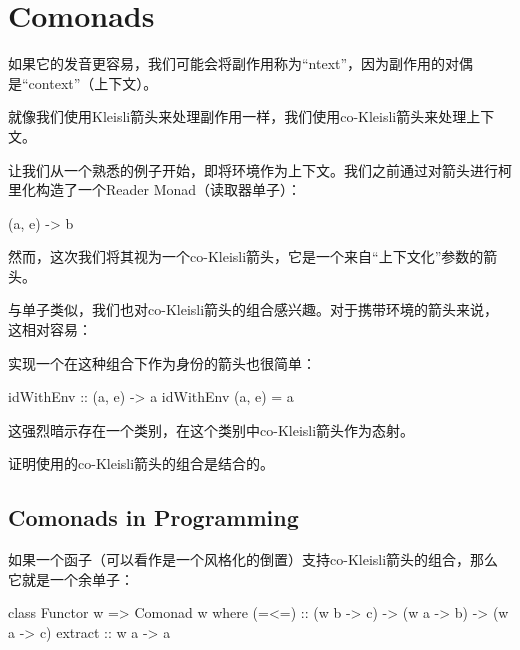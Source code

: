 \documentclass[DaoFP]{subfiles}
\begin{document}
    \setcounter{chapter}{15}

    \chapter{Comonads}

    如果它的发音更容易，我们可能会将副作用称为“ntext”，因为副作用的对偶是“context”（上下文）。

    就像我们使用Kleisli箭头来处理副作用一样，我们使用co-Kleisli箭头来处理上下文。

    让我们从一个熟悉的例子开始，即将环境作为上下文。我们之前通过对箭头进行柯里化构造了一个Reader Monad（读取器单子）：
    \begin{haskell}
    (a, e) -> b
    \end{haskell}
    然而，这次我们将其视为一个co-Kleisli箭头，它是一个来自“上下文化”参数的箭头。

    与单子类似，我们也对co-Kleisli箭头的组合感兴趣。对于携带环境的箭头来说，这相对容易：

    实现一个在这种组合下作为身份的箭头也很简单：
    \begin{haskell}
        idWithEnv :: (a, e) -> a
        idWithEnv (a, e) = a
    \end{haskell}

    这强烈暗示存在一个类别，在这个类别中co-Kleisli箭头作为态射。

    \begin{exercise}
        证明使用的co-Kleisli箭头的组合是结合的。
    \end{exercise}

    \section{Comonads in Programming}

    如果一个函子（可以看作是一个风格化的倒置）支持co-Kleisli箭头的组合，那么它就是一个余单子：

    \begin{haskell}
        class Functor w => Comonad w where
        (=<=) :: (w b -> c) -> (w a -> b) -> (w a -> c)
        extract :: w a -> a
    \end{haskell}
\end{document}
